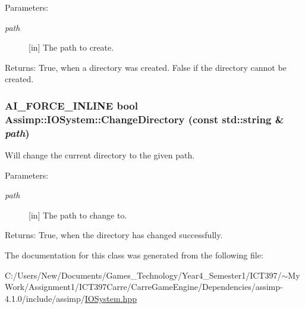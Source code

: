 \begin{Desc}
\item[Parameters:]
\begin{description}
\item[{\em path}]\mbox{[}in\mbox{]} The path to create. \end{description}
\end{Desc}
\begin{Desc}
\item[Returns:]True, when a directory was created. False if the directory cannot be created. \end{Desc}
\hypertarget{class_assimp_1_1_i_o_system_93e80760bd5d5239ba8eab3bd31efa6b}{
\subsubsection[ChangeDirectory]{\setlength{\rightskip}{0pt plus 5cm}AI\_\-FORCE\_\-INLINE bool Assimp::IOSystem::ChangeDirectory (const std::string \& {\em path})}}
\label{class_assimp_1_1_i_o_system_93e80760bd5d5239ba8eab3bd31efa6b}


Will change the current directory to the given path. 

\begin{Desc}
\item[Parameters:]
\begin{description}
\item[{\em path}]\mbox{[}in\mbox{]} The path to change to. \end{description}
\end{Desc}
\begin{Desc}
\item[Returns:]True, when the directory has changed successfully. \end{Desc}


The documentation for this class was generated from the following file:\begin{CompactItemize}
\item 
C:/Users/New/Documents/Games\_\-Technology/Year4\_\-Semester1/ICT397/$\sim$My Work/Assignment1/ICT397Carre/CarreGameEngine/Dependencies/assimp-4.1.0/include/assimp/\hyperlink{_i_o_system_8hpp}{IOSystem.hpp}\end{CompactItemize}
